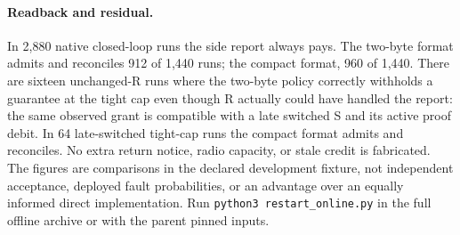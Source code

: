 \documentclass{article}
\begin{document}
\paragraph{Readback and residual.}
In 2,880 native closed-loop runs the side report always pays.
The two-byte format admits and reconciles 912 of 1,440 runs;
the compact format, 960 of 1,440. There are sixteen unchanged-R
runs where the two-byte policy correctly withholds a guarantee
at the tight cap even though R actually could have handled the
report: the same observed grant is compatible with a late
switched S and its active proof debit. In 64 late-switched
tight-cap runs the compact format admits and reconciles.
No extra return notice, radio capacity, or stale credit is
fabricated. The figures are comparisons in the declared
development fixture, not independent acceptance, deployed
fault probabilities, or an advantage over an equally informed
direct implementation. Run \texttt{python3 restart\_online.py}
in the full offline archive or with the parent pinned inputs.
\end{document}
